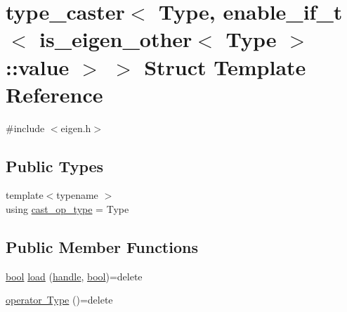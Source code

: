 \hypertarget{structtype__caster_3_01_type_00_01enable__if__t_3_01is__eigen__other_3_01_type_01_4_1_1value_01_4_01_4}{}\section{type\+\_\+caster$<$ Type, enable\+\_\+if\+\_\+t$<$ is\+\_\+eigen\+\_\+other$<$ Type $>$\+::value $>$ $>$ Struct Template Reference}
\label{structtype__caster_3_01_type_00_01enable__if__t_3_01is__eigen__other_3_01_type_01_4_1_1value_01_4_01_4}


{\ttfamily \#include $<$eigen.\+h$>$}

\subsection*{Public Types}
\begin{DoxyCompactItemize}
\item 
{\footnotesize template$<$typename $>$ }\\using \mbox{\hyperlink{structtype__caster_3_01_type_00_01enable__if__t_3_01is__eigen__other_3_01_type_01_4_1_1value_01_4_01_4_a7fdd708c43bd783fa5e327a2c976e246}{cast\+\_\+op\+\_\+type}} = Type
\end{DoxyCompactItemize}
\subsection*{Public Member Functions}
\begin{DoxyCompactItemize}
\item 
\mbox{\hyperlink{asdl_8h_af6a258d8f3ee5206d682d799316314b1}{bool}} \mbox{\hyperlink{structtype__caster_3_01_type_00_01enable__if__t_3_01is__eigen__other_3_01_type_01_4_1_1value_01_4_01_4_a4fc54d74dd4bd4748303a182b02258d1}{load}} (\mbox{\hyperlink{classhandle}{handle}}, \mbox{\hyperlink{asdl_8h_af6a258d8f3ee5206d682d799316314b1}{bool}})=delete
\item 
\mbox{\hyperlink{structtype__caster_3_01_type_00_01enable__if__t_3_01is__eigen__other_3_01_type_01_4_1_1value_01_4_01_4_a93d783bdbb1d24bce052cabac2736f28}{operator Type}} ()=delete
\end{DoxyCompactItemize}
